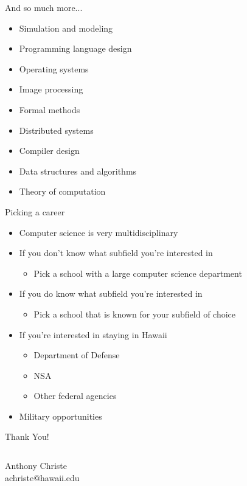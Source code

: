 \documentclass{beamer}
\begin{document}
\begin{frame}{And so much more...}
\begin{itemize}
	\item Simulation and modeling
	\item Programming language design
	\item Operating systems
	\item Image processing
	\item Formal methods
	\item Distributed systems
	\item Compiler design
	\item Data structures and algorithms
	\item Theory of computation
\end{itemize}
\end{frame}

\begin{frame}{Picking a career}
\begin{itemize}
	\item Computer science is very multidisciplinary
	\item If you don't know what subfield you're interested in
	\begin{itemize}
		\item Pick a school with a large computer science department
	\end{itemize}
	\item If you do know what subfield you're interested in
	\begin{itemize}
		\item Pick a school that is known for your subfield of choice
	\end{itemize}
	\item If you're interested in staying in Hawaii
	\begin{itemize}
		\item Department of Defense
		\item NSA
		\item Other federal agencies
	\end{itemize}
	\item Military opportunities
\end{itemize}
\end{frame}

\begin{frame}{Thank You!}
\begin{columns}
	\begin{column}{.35\textwidth}
		Anthony Christe \\
		achriste@hawaii.edu
	\end{column}
\end{columns}
\end{frame}
\end{document}
